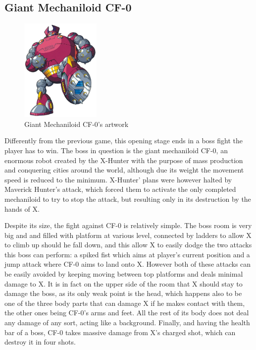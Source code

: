\subsection{Giant Mechaniloid CF-0}
\begin{figure}[htp]
	\centering
	\includegraphics[height=5cm]{figures/X2/Enemies/CF0.png}
	\caption{Giant Mechaniloid CF-0's artwork}
\end{figure}
Differently from the previous game, this opening stage ends in a boss fight the player has to win. The boss in question is the giant mechaniloid CF-0, an enormous robot created by the X-Hunter with the purpose of mass production and conquering cities around the world, although due its weight the movement speed is reduced to the minimum. X-Hunter' plans were however halted by Maverick Hunter's attack, which forced them to activate the only completed mechaniloid to try to stop the attack, but resulting only in its destruction by the hands of X.

Despite its size, the fight against CF-0 is relatively simple. The boss room is very big and and filled with platform at various level, connected by ladders to allow X to climb up should he fall down, and this allow X to easily dodge the two attacks this boss can perform: a spiked fist which aims at player's current position and a jump attack where CF-0 aims to land onto X. However both of these attacks can be easily avoided by keeping moving between top platforms and deals minimal damage to X. It is in fact on the upper side of the room that X should stay to damage the boss, as its only weak point is the head, which happens also to be one of the three body parts that can damage X if he makes contact with them, the other ones being CF-0's arms and feet. All the rest of its body does not deal any damage of any sort, acting like a background. Finally, and having the health bar of a boss, CF-0 takes massive damage from X's charged shot, which can destroy it in four shots.

